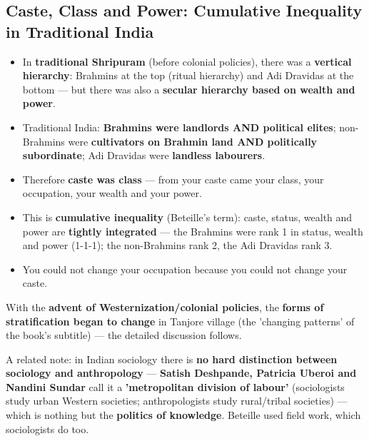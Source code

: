 \subsection{Caste, Class and Power: Cumulative Inequality in Traditional India}

\begin{KeyConcept}
\begin{itemize}
\item In \textbf{traditional Shripuram} (before colonial policies), there was a \textbf{vertical hierarchy}: Brahmins at the top (ritual hierarchy) and Adi Dravidas at the bottom --- but there was also a \textbf{secular hierarchy based on wealth and power}.
\item Traditional India: \textbf{Brahmins were landlords AND political elites}; non-Brahmins were \textbf{cultivators on Brahmin land AND politically subordinate}; Adi Dravidas were \textbf{landless labourers}.
\item Therefore \textbf{caste was class} --- from your caste came your class, your occupation, your wealth and your power.
\item This is \textbf{cumulative inequality} (Beteille's term): caste, status, wealth and power are \textbf{tightly integrated} --- the Brahmins were rank 1 in status, wealth and power (1-1-1); the non-Brahmins rank 2, the Adi Dravidas rank 3.
\item You could not change your occupation because you could not change your caste.
\end{itemize}
\end{KeyConcept}

\begin{KeyConcept}
With the \textbf{advent of Westernization/colonial policies}, the \textbf{forms of stratification began to change} in Tanjore village (the 'changing patterns' of the book's subtitle) --- the detailed discussion follows.
\end{KeyConcept}

\begin{CriticalPoint}
A related note: in Indian sociology there is \textbf{no hard distinction between sociology and anthropology} --- \textbf{Satish Deshpande, Patricia Uberoi and Nandini Sundar} call it a \textbf{'metropolitan division of labour'} (sociologists study urban Western societies; anthropologists study rural/tribal societies) --- which is nothing but the \textbf{politics of knowledge}. Beteille used field work, which sociologists do too.
\end{CriticalPoint}

